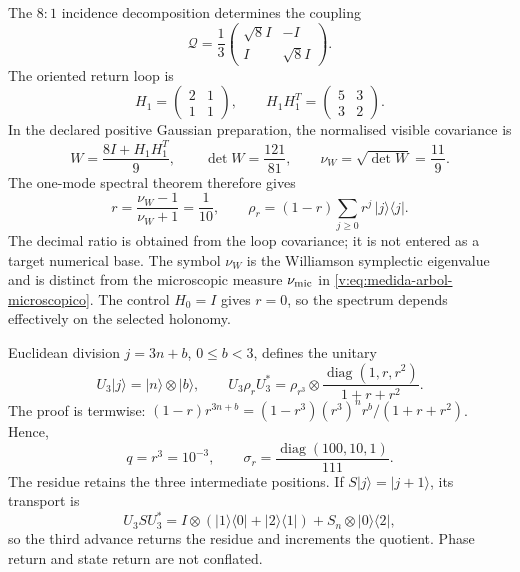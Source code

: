 The $8{:}1$ incidence decomposition determines the coupling
\[
 \mathcal Q=\frac13
 \begin{pmatrix}\sqrt8 I&-I\\ I&\sqrt8 I\end{pmatrix}.
\]
The oriented return loop is
\[
 H_1=\begin{pmatrix}2&1\\1&1\end{pmatrix},\qquad
 H_1H_1^T=\begin{pmatrix}5&3\\3&2\end{pmatrix}.
\]
In the declared positive Gaussian preparation, the normalised visible
covariance is
\begin{equation}
 W=\frac{8I+H_1H_1^T}{9},\qquad
 \det W=\frac{121}{81},\qquad
 \nu_W=\sqrt{\det W}=\frac{11}{9}.
 \label{v:eq:williamson-decimal}
\end{equation}
The one-mode spectral theorem therefore gives
\begin{equation}
 r=\frac{\nu_W-1}{\nu_W+1}=\frac1{10},\qquad
 \rho_r=(1-r)\sum_{j\ge0}r^j\,|j\rangle\langle j|.
 \label{v:eq:estado-geometrico-decimal}
\end{equation}
The decimal ratio is obtained from the loop covariance; it is not entered as
a target numerical base. The symbol $\nu_W$ is the Williamson symplectic
eigenvalue and is distinct from the microscopic measure $\nu_{\rm mic}$ in
\eqref{v:eq:medida-arbol-microscopico}. The control $H_0=I$ gives $r=0$,
so the spectrum depends effectively on the selected holonomy.

Euclidean division $j=3n+b$, $0\le b<3$, defines the unitary
\begin{equation}
 U_3|j\rangle=|n\rangle\otimes|b\rangle,\qquad
 U_3\rho_rU_3^*=\rho_{r^3}\otimes
 \frac{\operatorname{diag}(1,r,r^2)}{1+r+r^2}.
 \label{v:eq:agrupamiento-tritico-espectral}
\end{equation}
The proof is termwise:
$(1-r)r^{3n+b}=(1-r^3)(r^3)^n r^b/(1+r+r^2)$. Hence,
\begin{equation}
 q=r^3=10^{-3},\qquad
 \sigma_r=\frac{\operatorname{diag}(100,10,1)}{111}.
 \label{v:eq:razon-milenaria-y-residuo}
\end{equation}
The residue retains the three intermediate positions. If
$S|j\rangle=|j+1\rangle$, its transport is
\[
 U_3SU_3^*=I\otimes(|1\rangle\langle0|+|2\rangle\langle1|)
 +S_n\otimes|0\rangle\langle2|,
\]
so the third advance returns the residue and increments the quotient. Phase
return and state return are not conflated.

